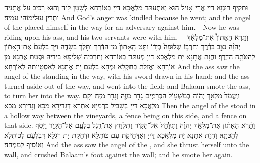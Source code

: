{וּתְקֵיף רוּגְזָא דַּייָ אֲרֵי אָזֵיל הוּא וְאִתְעַתַּד מַלְאֲכָא דַּייָ בְּאוֹרְחָא לְשָׂטָן לֵיהּ וְהוּא רָכֵיב עַל אֲתָנֵיהּ וּתְרֵין עוּלֵימוֹהִי עִמֵּיהּ׃}
{And God’s anger was kindled because he went; and the angel of the \lord\space placed himself in the way for an adversary against him.—Now he was riding upon his ass, and his two servants were with him.—}{}
{וַתֵּ֣רֶא הָאָתוֹן֩ אֶת־מַלְאַ֨ךְ יְהֹוָ֜ה נִצָּ֣ב בַּדֶּ֗רֶךְ וְחַרְבּ֤וֹ שְׁלוּפָה֙ בְּיָד֔וֹ וַתֵּ֤ט הָֽאָתוֹן֙ מִן־הַדֶּ֔רֶךְ וַתֵּ֖לֶךְ בַּשָּׂדֶ֑ה וַיַּ֤ךְ בִּלְעָם֙ אֶת־הָ֣אָת֔וֹן לְהַטֹּתָ֖הּ הַדָּֽרֶךְ׃
}
{וַחֲזָת אֲתָנָא יָת מַלְאֲכָא דַּייָ מְעַתַּד בְּאוֹרְחָא וְחַרְבֵּיהּ שְׁלִיפָא בִּידֵיהּ וּסְטָת אֲתָנָא מִן אוֹרְחָא וַאֲזַלַת בְּחַקְלָא וּמְחָא בִלְעָם יָת אֲתָנָא לְאַסְטָיוּתַהּ לְאוֹרְחָא׃}
{And the ass saw the angel of the \lord\space standing in the way, with his sword drawn in his hand; and the ass turned aside out of the way, and went into the field; and Balaam smote the ass, to turn her into the way.}{}
{וַֽיַּעֲמֹד֙ מַלְאַ֣ךְ יְהֹוָ֔ה בְּמִשְׁע֖וֹל הַכְּרָמִ֑ים גָּדֵ֥ר מִזֶּ֖ה וְגָדֵ֥ר מִזֶּֽה׃
}
{וְקָם מַלְאֲכָא דַּייָ בְּשָׁבִיל כַּרְמַיָּא אַתְרָא דְּגָדֵירָא מִכָּא וְגָדֵירָא מִכָּא׃}
{Then the angel of the \lord\space stood in a hollow way between the vineyards, a fence being on this side, and a fence on that side.}{}
{וַתֵּ֨רֶא הָאָת֜וֹן אֶת־מַלְאַ֣ךְ יְהֹוָ֗ה וַתִּלָּחֵץ֙ אֶל־הַקִּ֔יר וַתִּלְחַ֛ץ אֶת־רֶ֥גֶל בִּלְעָ֖ם אֶל־הַקִּ֑יר וַיֹּ֖סֶף לְהַכֹּתָֽהּ׃
}
{וַחֲזָת אֲתָנָא יָת מַלְאֲכָא דַּייָ וְאִדְּחֵיקַת עִם כּוּתְלָא וּדְחַקַת יָת רִגְלָא דְּבִלְעָם לְכוּתְלָא וְאוֹסֵיף לְמִמְחַהּ׃}
{And the ass saw the angel of the \lord, and she thrust herself unto the wall, and crushed Balaam’s foot against the wall; and he smote her again.}{}
